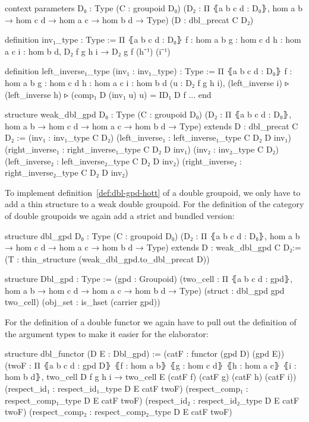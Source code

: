 \begin{leancodebr}
context
  parameters
    {D₀ : Type}
    (C : groupoid D₀)
    (D₂ : Π ⦃a b c d : D₀⦄, hom a b → hom c d → hom a c →  hom b d → Type)
    (D : dbl_precat C D₂)

  definition inv₁_type : Type :=
  Π ⦃a b c d : D₀⦄ {f : hom a b} {g : hom c d} {h : hom a c} {i : hom b d},
    D₂ f g h i → D₂ g f (h⁻¹) (i⁻¹)

  definition left_inverse₁_type (inv₁ : inv₁_type) : Type :=
  Π ⦃a b c d : D₀⦄ {f : hom a b} {g : hom c d} {h : hom a c} {i : hom b d}
    (u : D₂ f g h i),
    (left_inverse i) ▹ (left_inverse h) ▹ (comp₁ D (inv₁ u) u) = ID₁ D f
  ...
end

structure weak_dbl_gpd {D₀ : Type} (C : groupoid D₀)
  (D₂ : Π ⦃a b c d : D₀⦄, hom a b → hom c d → hom a c →  hom b d → Type)
  extends D : dbl_precat C D₂ :=
  (inv₁ : inv₁_type C D₂)
  (left_inverse₁ : left_inverse₁_type C D₂ D inv₁)
  (right_inverse₁ : right_inverse₁_type C D₂ D inv₁)
  (inv₂ : inv₂_type C D₂)
  (left_inverse₂ : left_inverse₂_type C D₂ D inv₂)
  (right_inverse₂ : right_inverse₂_type C D₂ D inv₂)
\end{leancodebr}

To implement definition~\ref{def:dbl-gpd-hott} of a double
group\-oid, we only have to add a thin structure to a weak double groupoid.
For the definition of the category of double group\-oids we again add a strict and
bundled version:
\begin{leancodebr}
structure dbl_gpd {D₀ : Type} (C : groupoid D₀) (D₂ : Π ⦃a b c d : D₀⦄, 
    hom a b → hom c d → hom a c →  hom b d → Type)
  extends D : weak_dbl_gpd C D₂:=
  (T : thin_structure (weak_dbl_gpd.to_dbl_precat D))

structure Dbl_gpd : Type :=
  (gpd : Groupoid)
  (two_cell : Π ⦃a b c d : gpd⦄,
    hom a b → hom c d → hom a c →  hom b d → Type)
  (struct : dbl_gpd gpd two_cell)
  (obj_set : is_hset (carrier gpd))
\end{leancodebr}

For the definition of a double functor we again have to pull out the definition
of the argument types to make it easier for the elaborator:

\begin{leancodebr}
  structure dbl_functor (D E : Dbl_gpd) :=
    (catF : functor (gpd D) (gpd E))
    (twoF : Π ⦃a b c d : gpd D⦄
      ⦃f : hom a b⦄ ⦃g : hom c d⦄ ⦃h : hom a c⦄ ⦃i : hom b d⦄,
      two_cell D f g h i → two_cell E (catF f) (catF g) (catF h) (catF i))
    (respect_id₁ : respect_id₁_type D E catF twoF)
    (respect_comp₁ : respect_comp₁_type D E catF twoF)
    (respect_id₂ : respect_id₂_type D E catF twoF)
    (respect_comp₂ : respect_comp₂_type D E catF twoF)
\end{leancodebr}

